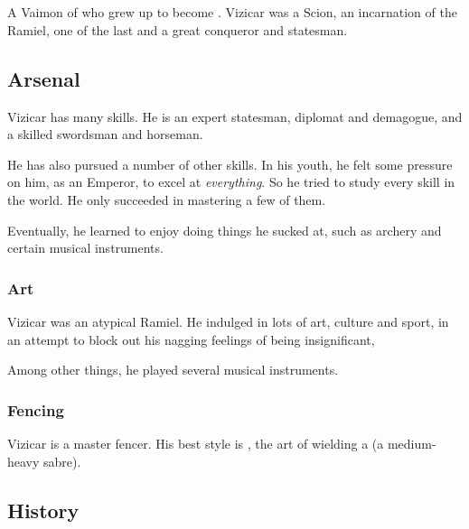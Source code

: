 \section{\VizicarDurasRespina}
\index{\VizicarDurasRespina}
A Vaimon of \ClanDelain who grew up to become \VaimonCaliph. 
Vizicar was a Scion, an incarnation of the \Malach{} Ramiel, one of the last \VaimonCaliphs and a great conqueror and statesman. 









\subsection{Arsenal}
Vizicar has many skills. He is an expert statesman, diplomat and demagogue, and a skilled swordsman and horseman. 

He has also pursued a number of other skills. In his youth, he felt some pressure on him, as an Emperor, to excel at \emph{everything}. So he tried to study every skill in the world. He only succeeded in mastering a few of them. 

Eventually, he learned to enjoy doing things he sucked at, such as archery and certain musical instruments. 





\subsubsection{Art}
Vizicar was an atypical Ramiel. 
He indulged in lots of art, culture and sport, in an attempt to block out his nagging feelings of being insignificant, 

Among other things, he played several musical instruments. 





\subsubsection{Fencing}
Vizicar is a master fencer. 
His best style is \chatresse, the art of wielding a \chandre{} (a medium-heavy sabre). 









\subsection{History}





